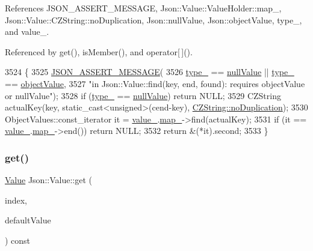 References J\+S\+O\+N\+\_\+\+A\+S\+S\+E\+R\+T\+\_\+\+M\+E\+S\+S\+A\+GE, Json\+::\+Value\+::\+Value\+Holder\+::map\+\_\+, Json\+::\+Value\+::\+C\+Z\+String\+::no\+Duplication, Json\+::null\+Value, Json\+::object\+Value, type\+\_\+, and value\+\_\+.



Referenced by get(), is\+Member(), and operator\mbox{[}$\,$\mbox{]}().


\begin{DoxyCode}
3524 \{
3525   \hyperlink{json_8h_ad7facdeeca0f495765e3b204c265eadb}{JSON\_ASSERT\_MESSAGE}(
3526       \hyperlink{class_json_1_1_value_abd222c2536dc88bf330dedcd076d2356}{type\_} == \hyperlink{namespace_json_a7d654b75c16a57007925868e38212b4ea7d9899633b4409bd3fc107e6737f8391}{nullValue} || \hyperlink{class_json_1_1_value_abd222c2536dc88bf330dedcd076d2356}{type\_} == \hyperlink{namespace_json_a7d654b75c16a57007925868e38212b4eae8386dcfc36d1ae897745f7b4f77a1f6}{objectValue},
3527       \textcolor{stringliteral}{"in Json::Value::find(key, end, found): requires objectValue or nullValue"});
3528   \textcolor{keywordflow}{if} (\hyperlink{class_json_1_1_value_abd222c2536dc88bf330dedcd076d2356}{type\_} == \hyperlink{namespace_json_a7d654b75c16a57007925868e38212b4ea7d9899633b4409bd3fc107e6737f8391}{nullValue}) \textcolor{keywordflow}{return} NULL;
3529   CZString actualKey(key, static\_cast<unsigned>(cend-key), 
      \hyperlink{class_json_1_1_value_1_1_c_z_string_a2805c46fb4a72bbaed55de6d75941b6da08d540450fa6c4af57eaacf063eedd20}{CZString::noDuplication});
3530   ObjectValues::const\_iterator it = \hyperlink{class_json_1_1_value_aef578244546212705b9f81eb84d7e151}{value\_}.\hyperlink{union_json_1_1_value_1_1_value_holder_a1e7a5b86d4f52234f55c847ad1ce389a}{map\_}->find(actualKey);
3531   \textcolor{keywordflow}{if} (it == \hyperlink{class_json_1_1_value_aef578244546212705b9f81eb84d7e151}{value\_}.\hyperlink{union_json_1_1_value_1_1_value_holder_a1e7a5b86d4f52234f55c847ad1ce389a}{map\_}->end()) \textcolor{keywordflow}{return} NULL;
3532   \textcolor{keywordflow}{return} &(*it).second;
3533 \}
\end{DoxyCode}
\mbox{\label{class_json_1_1_value_a034eb7bf85a44fa759bdaa232788ca66}} 
\subsubsection{\texorpdfstring{get()}{get()}\hspace{0.1cm}{\footnotesize\ttfamily [1/4]}}
{\footnotesize\ttfamily \hyperlink{class_json_1_1_value}{Value} Json\+::\+Value\+::get (\begin{DoxyParamCaption}\item[{\hyperlink{class_json_1_1_value_a184a91566cccca7b819240f0d5561c7d}{Array\+Index}}]{index,  }\item[{const \hyperlink{class_json_1_1_value}{Value} \&}]{default\+Value }\end{DoxyParamCaption}) const}

